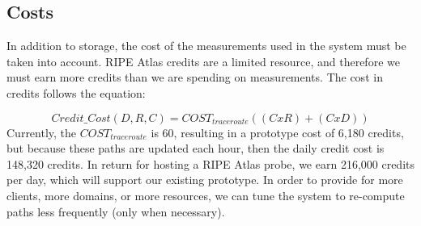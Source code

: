 \subsection{Costs}
In addition to storage, the cost of the measurements used in the system must 
be taken into account.  RIPE Atlas credits are a limited resource, and therefore 
we must earn more credits than we are spending on measurements.  The cost 
in credits follows the equation:

\[Credit\_Cost(D,R,C) = COST_{traceroute}((C x R) + (C x D))\]
\noindent
Currently, the $COST_{traceroute}$ is 60, resulting in a prototype cost of 6,180 
credits, but because these paths are updated each hour, then 
the daily credit cost is 148,320 credits.  In return for hosting a RIPE Atlas 
probe, we earn 216,000 credits per day, which will support our existing 
prototype.  In order to provide for more clients, more domains, or more 
resources, we can tune the system to re-compute paths less frequently (only when necessary).
